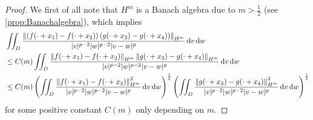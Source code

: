 \begin{proof}
	We first of all note that $H^m$ is a Banach algebra due to $m>\frac 12$ (see \eqref{prop:Banachalgebra}), which implies 
	\begin{align*}
	& \iint_D   \frac{ \left\| \left(f(\cdot+x_1) - f(\cdot+x_2) \right) \left(g(\cdot+x_3) - g(\cdot+x_4) \right) \right\|_{H^m}}{|v|^{p-2}|w|^{p-2}|v-w|^{p}}  \d v \d w \nonumber  \\
	& \leq C(m) \iint_D   \frac{ \left\| f(\cdot+x_1) - f(\cdot+x_2) \right\|_{H^m} \left\|g(\cdot+x_3) - g(\cdot+x_4) \right\|_{H^m}}{|v|^{p-2}|w|^{p-2}|v-w|^{p}}  \d v \d w \nonumber  \\
	& \leq C(m) \left(\iint_D   \frac{ \left\| f(\cdot+x_1) - f(\cdot+x_2) \right\|^2_{H^m}}{|v|^{p-2}|w|^{p-2}|v-w|^{p}}  \d v \d w \right)^{\frac 12}  \left(\iint_D   \frac{\left\|g(\cdot+x_3) - g(\cdot+x_4) \right\|^2_{H^m}}{|v|^{p-2}|w|^{p-2}|v-w|^{p}}  \d v \d w \right)^{\frac 12}
	\end{align*}
	for some positive constant $C(m)$ only depending on $m$. 
	

\end{proof}

